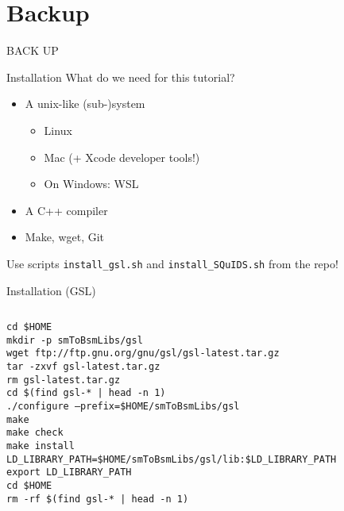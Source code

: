 \documentclass[]{beamer}
\newcommand{\backupbegin}{
	\newcounter{finalframe}
	\setcounter{finalframe}{\value{framenumber}}
}
\begin{document}
\appendix

\section{Backup}
\backupbegin

\begin{frame}
    \centering \Huge BACK UP
\end{frame}

\begin{frame}{Installation}
  What do we need for this tutorial?
  \begin{itemize}
    \item A unix-like (sub-)system 
    \begin{itemize}
      \item Linux
      \item Mac (+ Xcode developer tools!)
      \item On Windows: WSL
    \end{itemize}
    \item A C++ compiler
    \item Make, wget, Git
  \end{itemize}
  Use scripts \texttt{install\_gsl.sh} and \texttt{install\_SQuIDS.sh} from the repo!
\end{frame}

\begin{frame}{Installation (GSL)}
  \begin{columns}
    \begin{column}{\textwidth}
      {\tiny
        \begin{tcolorbox}[colback=gray!5!white]
        \texttt{cd \$HOME} \\
        \texttt{mkdir -p smToBsmLibs/gsl} \\
        \texttt{wget ftp://ftp.gnu.org/gnu/gsl/gsl-latest.tar.gz} \\
        \texttt{tar -zxvf gsl-latest.tar.gz} \\
        \texttt{rm gsl-latest.tar.gz} \\
        \texttt{cd \$(find gsl-* | head -n 1)} \\
        \texttt{./configure --prefix=\$HOME/smToBsmLibs/gsl} \\
        \texttt{make} \\
        \texttt{make check} \\
        \texttt{make install} \\
        \texttt{LD\_LIBRARY\_PATH=\$HOME/smToBsmLibs/gsl/lib:\$LD\_LIBRARY\_PATH} \\
        \texttt{export LD\_LIBRARY\_PATH} \\
        \texttt{cd \$HOME} \\
        \texttt{rm -rf \$(find gsl-* | head -n 1)}
      \end{tcolorbox}}
    \end{column}
  \end{columns}
\end{frame}
\end{document}
